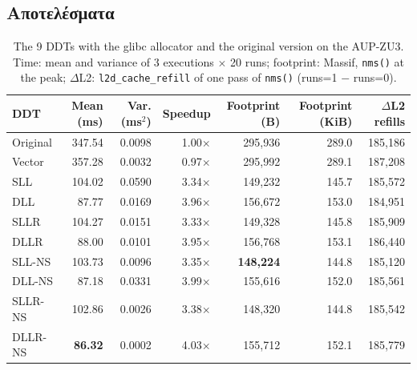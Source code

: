 \documentclass[11pt,a4paper]{article}
\begin{document}
\subsection{Αποτελέσματα}
\begin{table}[H]
\centering
\caption{The 9 DDTs with the glibc allocator and the original version on the AUP-ZU3. Time: mean and variance of 3 executions $\times$ 20 runs; footprint: Massif, \texttt{nms()} at the peak; $\Delta$L2: \texttt{l2d\_cache\_refill} of one pass of \texttt{nms()} (runs=1 $-$ runs=0).}
\label{tab:q2}
\begin{tabular}{@{}lrrrrrr@{}}
\toprule
DDT & Mean (ms) & Var. (ms$^2$) & Speedup & Footprint (B) & Footprint (KiB) & $\Delta$L2 refills \\
\midrule
Original & 347.54 & 0.0098 & 1.00$\times$ & 295{,}936 & 289.0 & 185{,}186 \\
\midrule
Vector & 357.28 & 0.0032 & 0.97$\times$ & 295{,}992 & 289.1 & 187{,}208 \\
SLL & 104.02 & 0.0590 & 3.34$\times$ & 149{,}232 & 145.7 & 185{,}572 \\
DLL & 87.77 & 0.0169 & 3.96$\times$ & 156{,}672 & 153.0 & 184{,}951 \\
SLLR & 104.27 & 0.0151 & 3.33$\times$ & 149{,}328 & 145.8 & 185{,}909 \\
DLLR & 88.00 & 0.0101 & 3.95$\times$ & 156{,}768 & 153.1 & 186{,}440 \\
SLL-NS & 103.73 & 0.0096 & 3.35$\times$ & \textbf{148{,}224} & 144.8 & 185{,}120 \\
DLL-NS & 87.18 & 0.0331 & 3.99$\times$ & 155{,}616 & 152.0 & 185{,}561 \\
SLLR-NS & 102.86 & 0.0026 & 3.38$\times$ & 148{,}320 & 144.8 & 185{,}542 \\
DLLR-NS & \textbf{86.32} & 0.0002 & 4.03$\times$ & 155{,}712 & 152.1 & 185{,}779 \\
\bottomrule
\end{tabular}
\end{table}
\end{document}
